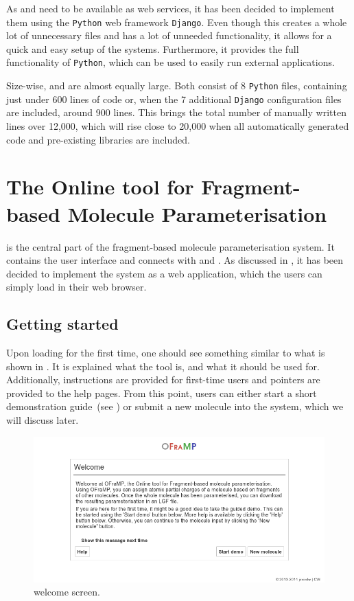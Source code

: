 As \oapoc{} and \omfraf{} need to be available as web services, it has been decided to implement them using the \verb|Python| web framework \verb|Django|. Even though this creates a whole lot of unnecessary files and has a lot of unneeded functionality, it allows for a quick and easy setup of the systems. Furthermore, it provides the full functionality of \verb|Python|, which can be used to easily run external applications.

Size-wise, \oapoc{} and \omfraf{} are almost equally large. Both consist of 8 \verb|Python| files, containing just under 600 lines of code or, when the 7 additional \verb|Django| configuration files are included, around 900 lines. This brings the total number of manually written lines over 12,000, which will rise close to 20,000 when all automatically generated code and pre-existing libraries are included.



\section[\oframp]{The Online tool for Fragment-based Molecule Parameterisation}
\oframp{} is the central part of the fragment-based molecule parameterisation system. It contains the user interface and connects with \oapoc{} and \omfraf{}. As discussed in , it has been decided to implement the system as a web application, which the users can simply load in their web browser.


\subsection{Getting started}
Upon loading \oframp{} for the first time, one should see something similar to what is shown in . It is explained what the tool is, and what it should be used for. Additionally, instructions are provided for first-time users and pointers are provided to the help pages. From this point, users can either start a short demonstration guide~(see ) or submit a new molecule into the system, which we will discuss later.

\begin{figure}
\center
\includegraphics[width=.9\textwidth]{img/impl_welcome.png}
\caption{\oframp{} welcome screen.}
\end{figure}

